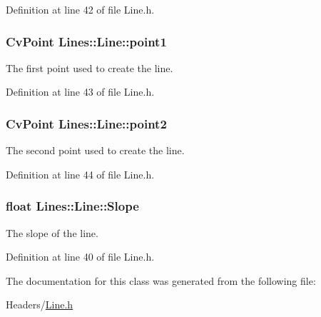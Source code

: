 Definition at line 42 of file Line.h.

\hypertarget{classLines_1_1Line_a94abfd90c052a5486d09a8c1333d11bc}{
\subsubsection[{point1}]{\setlength{\rightskip}{0pt plus 5cm}CvPoint {\bf Lines::Line::point1}}}
\label{classLines_1_1Line_a94abfd90c052a5486d09a8c1333d11bc}


The first point used to create the line. 



Definition at line 43 of file Line.h.

\hypertarget{classLines_1_1Line_ad6404e7f19ae9a7fc62300249b12662f}{
\subsubsection[{point2}]{\setlength{\rightskip}{0pt plus 5cm}CvPoint {\bf Lines::Line::point2}}}
\label{classLines_1_1Line_ad6404e7f19ae9a7fc62300249b12662f}


The second point used to create the line. 



Definition at line 44 of file Line.h.

\hypertarget{classLines_1_1Line_a6f7ca43e76d34c90709495ef2daa631a}{
\subsubsection[{Slope}]{\setlength{\rightskip}{0pt plus 5cm}float {\bf Lines::Line::Slope}}}
\label{classLines_1_1Line_a6f7ca43e76d34c90709495ef2daa631a}


The slope of the line. 



Definition at line 40 of file Line.h.



The documentation for this class was generated from the following file:\begin{DoxyCompactItemize}
\item 
Headers/\hyperlink{Line_8h}{Line.h}\end{DoxyCompactItemize}
